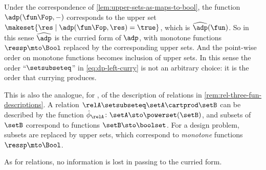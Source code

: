 Under the correspondence of \cref{lem:upper-sets-as-maps-to-bool}, the function $\adp(\fun\Fop, -)$ corresponds to the upper set $\makeset{\res \mid \adp(\fun\Fop, \res) = \true}$, which is $\widehat{\adp}(\fun)$.
So in this sense $\widehat{\adp}$ is the curried form of $\adp$, with monotone functions $\ressp \mto \Bool$ replaced by the corresponding upper sets.
And the point-wise order on monotone functions becomes inclusion of upper sets.
In this sense the order ``$\setsubseteq$'' in \cref{eq:dp-left-curry} is not an arbitrary choice: it is the order that currying produces.

This is also the analogue, for , of the description of relations in \cref{rem:rel-three-fun-descriptions}.
A relation $\relA \setsubseteq \setA \cartprod \setB$ can be described by the function $\hat\phi_\relA \colon \setA \sto \powerset(\setB)$, and subsets of $\setB$ correspond to functions $\setB \sto \boolset$.
For a design problem, subsets are replaced by upper sets, which correspond to \emph{monotone} functions $\ressp \mto \Bool$.

As for relations, no information is lost in passing to the curried form.

